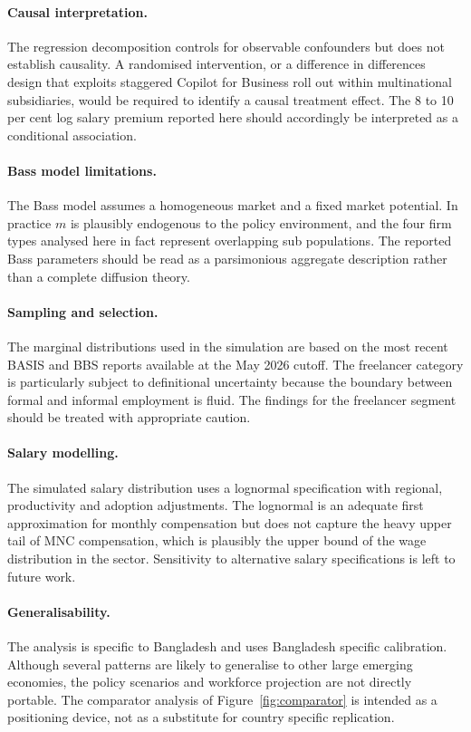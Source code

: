 \documentclass[11pt,a4paper]{report}
\begin{document}
\paragraph{Causal interpretation.}
The regression decomposition controls for observable confounders but
does not establish causality. A randomised intervention, or a difference
in differences design that exploits staggered Copilot for Business
roll out within multinational subsidiaries, would be required to
identify a causal treatment effect. The 8 to 10 per cent log salary
premium reported here should accordingly be interpreted as a
conditional association.

\paragraph{Bass model limitations.}
The Bass model assumes a homogeneous market and a fixed market
potential. In practice $m$ is plausibly endogenous to the policy
environment, and the four firm types analysed here in fact represent
overlapping sub populations. The reported Bass parameters should be
read as a parsimonious aggregate description rather than a complete
diffusion theory.

\paragraph{Sampling and selection.}
The marginal distributions used in the simulation are based on the most
recent BASIS and BBS reports available at the May 2026 cutoff. The
freelancer category is particularly subject to definitional uncertainty
because the boundary between formal and informal employment is fluid.
The findings for the freelancer segment should be treated with
appropriate caution.

\paragraph{Salary modelling.}
The simulated salary distribution uses a lognormal specification with
regional, productivity and adoption adjustments. The lognormal is an
adequate first approximation for monthly compensation but does not
capture the heavy upper tail of MNC compensation, which is plausibly
the upper bound of the wage distribution in the sector. Sensitivity
to alternative salary specifications is left to future work.

\paragraph{Generalisability.}
The analysis is specific to Bangladesh and uses Bangladesh specific
calibration. Although several patterns are likely to generalise to
other large emerging economies, the policy scenarios and workforce
projection are not directly portable. The comparator analysis of
Figure~\ref{fig:comparator} is intended as a positioning device,
not as a substitute for country specific replication.
\end{document}
